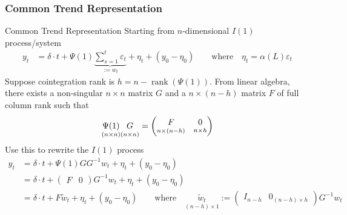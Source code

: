 \documentclass[aspectratio=169, handout]{beamer}
\newcommand{\rank}{\operatorname{rank}}
\begin{document}
\subsubsection{Common Trend Representation}

{\footnotesize
\begin{frame}{Common Trend Representation}
Starting from $n$-dimensional $I(1)$ process/system
\begin{align*}
  y_t
  &=
  \delta \cdot t
  +
  \Psi(1)
  \underbrace{
  \sum_{s=1}^t
  \varepsilon_t
  }_{:=w_t}
  +
  \eta_t
  +
  (y_0-\eta_0)
  \qquad\text{where}\quad
  \eta_t
  =
  \alpha(L)\varepsilon_t
\end{align*}
\pause
Suppose cointegration rank is $h=n-\rank(\Psi(1))$.
From linear algebra, there exists a non-singular $n\times n$
matrix $G$ and a $n\times (n-h)$ matrix $F$ of full column rank such
that
\begin{align*}
  \underset{(n\times n)}{\Psi(1)}
  \underset{(n\times n)}{G\vphantom{\Psi(1)}}
  =
  \begin{pmatrix}
    \underset{n\times (n-h)}{F\vphantom{\Psi(1)}}
    &
    \underset{n\times h}{0\vphantom{\Psi(1)}}
  \end{pmatrix}
\end{align*}
\pause
Use this to rewrite the $I(1)$ process
\begin{align*}
  y_t
  &=
  \delta \cdot t
  +
  \Psi(1)GG^{-1}
  w_t
  +
  \eta_t
  +
  (y_0-\eta_0)
  \\
  &=
  \delta \cdot t
  +
  \begin{pmatrix}
    F & 0
  \end{pmatrix}
  G^{-1}
  w_t
  +
  \eta_t
  +
  (y_0-\eta_0)
  \\
  &=
  \delta \cdot t
  +
  F\tilde{w}_t
  +
  \eta_t
  +
  (y_0-\eta_0)
  \qquad \text{where}\quad
  \underset{(n-h)\times 1}{\tilde{w}_t} :=
  \begin{pmatrix}
    I_{n-h} & 0_{(n-h)\times h}
  \end{pmatrix}
  G^{-1}w_t
\end{align*}
\end{frame}
}
\end{document}
